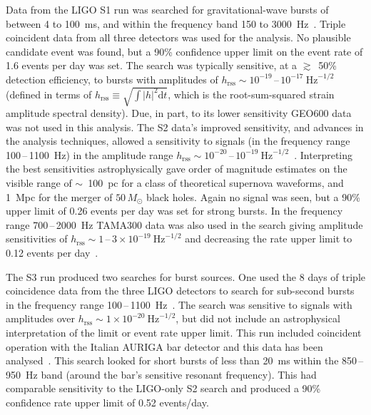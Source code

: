Data from the LIGO S1 run was searched for gravitational-wave bursts of between
4 to 100~ms, and within the frequency band 150 to 3000~Hz~\cite{Abbott:2004b}.
Triple coincident data from all three detectors was used for the analysis. No
plausible candidate event was found, but a 90\% confidence upper limit on the
event rate of 1.6 events per day was set. The search was typically sensitive, at
a $\gtrsim$~50\% detection efficiency, to bursts with amplitudes of
$h_{\mathrm{rss}}\sim10^{-19}$\,--\,$10^{-17} \mathrm{\ Hz}^{-1/2}$ (defined in
terms of $h_{\mathrm{rss}} \equiv \sqrt{\int|h|^2 \mathrm{d}t}$, which is the root-sum-squared strain
amplitude spectral density). Due, in part, to its lower sensitivity GEO600 data
was not used in this analysis. The S2 data's improved sensitivity, and advances
in the analysis techniques, allowed a sensitivity to signals (in the frequency
range 100\,--\,1100~Hz) in the amplitude range
$h_{\mathrm{rss}}\sim10^{-20}$\,--\,$10^{-19}\mathrm{\ Hz}^{-1/2}$~\cite{Abbott:2005a}. Interpreting the best
sensitivities astrophysically gave order of magnitude estimates on the
visible range of $\sim$~100~pc for a class of theoretical supernova waveforms,
and 1~Mpc for the merger of $50\,M_{\odot}$ black holes. Again no signal
was seen, but a 90\% upper limit of 0.26 events per day was set for strong
bursts. In the frequency range 700\,--\,2000~Hz TAMA300 data was also used in the
search giving amplitude sensitivities of
$h_{\mathrm{rss}}\sim1$\,--\,$3\times10^{-19}
\mathrm{\ Hz}^{-1/2}$ and decreasing the rate upper limit to 0.12
events per day~\cite{Abbott:2005c}.


The S3 run produced two searches for burst sources. One used the 8 days of
triple coincidence data from the three LIGO detectors to search for sub-second
bursts in the frequency range 100\,--\,1100~Hz~\cite{Abbott:2006a}. The search was
sensitive to signals with amplitudes over
$h_{\mathrm{rss}}\sim1\times10^{-20}\mathrm{\ Hz}^{-1/2}$, but did not
include an astrophysical interpretation of the limit or event rate
upper limit. This run included coincident operation with the Italian
AURIGA bar detector and this data has been
analysed~\cite{Baggio:2008}. This search looked for short bursts of
less than 20~ms within the 850\,--\,950~Hz band (around the bar's
sensitive resonant frequency). This had comparable sensitivity to the
LIGO-only S2 search and produced a 90\% confidence rate upper limit of
0.52 events/day.


